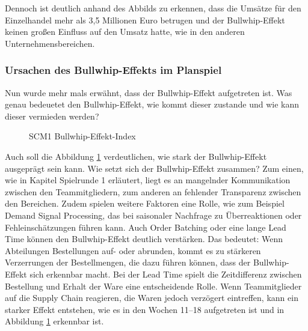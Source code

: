 \documentclass[a4paper,12pt]{article}
\begin{document}
Dennoch ist deutlich anhand des Abbilds zu erkennen, dass die Umsätze für den Einzelhandel mehr als 3,5 Millionen Euro betrugen
und der Bullwhip-Effekt keinen großen Einfluss auf den Umsatz hatte, wie in den anderen Unternehmensbereichen.

\subsubsection{Ursachen des Bullwhip-Effekts im Planspiel}
Nun wurde mehr mals erwähnt, dass der Bullwhip-Effekt aufgetreten ist.
Was genau bedeuetet den Bullwhip-Effekt, wie kommt dieser zustande und wie kann dieser vermieden werden?
\begin{figure}[H]
    \centering
    \caption{SCM1 Bullwhip-Effekt-Index}
    \label{fig:SCM1 Bullwhip-Effekt-Index}
\end{figure}
Auch soll die Abbildung \ref{fig:SCM1 Bullwhip-Effekt-Index} verdeutlichen, wie stark der Bullwhip-Effekt ausgeprägt sein kann.
Wie setzt sich der Bullwhip-Effekt zusammen? Zum einen, wie in Kapitel Spielrunde 1 erläutert, liegt es an mangelnder Kommunikation zwischen den Teammitgliedern,
 zum anderen an fehlender Transparenz zwischen den Bereichen.
Zudem spielen weitere Faktoren eine Rolle, wie zum Beispiel Demand Signal Processing, das bei saisonaler Nachfrage zu Überreaktionen oder Fehleinschätzungen führen kann.
Auch Order Batching oder eine lange Lead Time können den Bullwhip-Effekt deutlich verstärken.
Das bedeutet: Wenn Abteilungen Bestellungen auf- oder abrunden, kommt es zu stärkeren Verzerrungen der Bestellmengen, die dazu führen können, dass der Bullwhip-Effekt sich erkennbar macht.
Bei der Lead Time spielt die Zeitdifferenz zwischen Bestellung und Erhalt der Ware eine entscheidende Rolle.
Wenn Teammitglieder auf die Supply Chain reagieren, die Waren jedoch verzögert eintreffen, kann ein starker Effekt entstehen, wie es in den Wochen 11–18 aufgetreten ist und in Abbildung \ref{fig:SCM1 Bullwhip-Effekt-Index} erkennbar ist.
\end{document}

